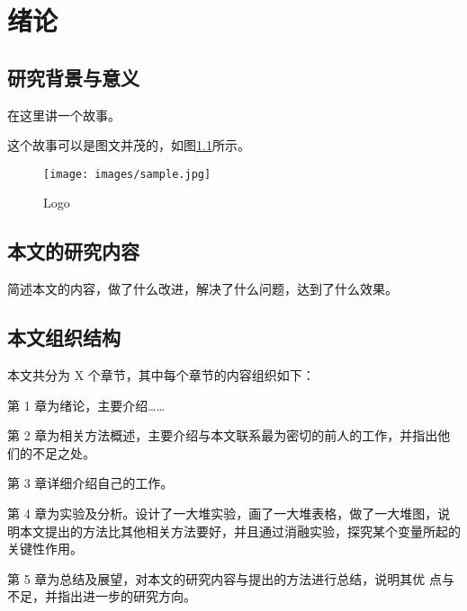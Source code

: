 \chapter{绪论}

\section{研究背景与意义}

在这里讲一个故事。

这个故事可以是图文并茂的，如图\ref{img:logo}所示。

\begin{figure}[!htbp]
    \begin{center}
        \texttt{[image: images/sample.jpg]}
        \caption{Logo}
        \label{img:logo}
    \end{center}
\end{figure}
\vspace{-1.5em}


\section{本文的研究内容}

简述本文的内容，做了什么改进，解决了什么问题，达到了什么效果。

\section{本文组织结构}

本文共分为 X 个章节，其中每个章节的内容组织如下：

第 1 章为绪论，主要介绍……

第 2 章为相关方法概述，主要介绍与本文联系最为密切的前人的工作，并指出他们的不足之处。

第 3 章详细介绍自己的工作。

第 4 章为实验及分析。设计了一大堆实验，画了一大堆表格，做了一大堆图，说明本文提出的方法比其他相关方法要好，并且通过消融实验，探究某个变量所起的关键性作用。

第 5 章为总结及展望，对本文的研究内容与提出的方法进行总结，说明其优 点与不足，并指出进一步的研究方向。
